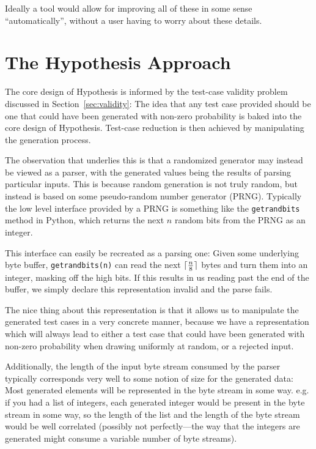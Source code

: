 
Ideally a tool would allow for improving all of these in some sense ``automatically'',
without a user having to worry about these details.

\chapter{The Hypothesis Approach}

The core design of Hypothesis is informed by the test-case validity problem discussed in Section~\ref{sec:validity}:
The idea that any test case provided should be one that could have been generated with non-zero probability is baked into the core design of Hypothesis.
Test-case reduction is then achieved by manipulating the generation process.

The observation that underlies this is that a randomized generator may instead be viewed as a parser,
with the generated values being the results of parsing particular inputs.
This is because random generation is not truly random,
but instead is based on some pseudo-random number generator (PRNG).
Typically the low level interface provided by a PRNG is something like the \texttt{getrandbits} method in Python,
which returns the next \(n\) random bits from the PRNG as an integer.

This interface can easily be recreated as a parsing one:
Given some underlying byte buffer,
\texttt{getrandbits(n)} can read the next \(\lceil\frac{n}{8}\rceil\) bytes and turn them into an integer,
masking off the high bits.
If this results in us reading past the end of the buffer,
we simply declare this representation invalid and the parse fails.

The nice thing about this representation is that it allows us to manipulate the generated test cases in a very concrete manner,
because we have a representation which will always lead to either a test case that could have been generated with non-zero probability when drawing uniformly at random,
or a rejected input.

Additionally,
the length of the input byte stream consumed by the parser typically corresponds very well to some notion of size for the generated data:
Most generated elements will be represented in the byte stream in some way.
e.g. if you had a list of integers,
each generated integer would be present in the byte stream in some way,
so the length of the list and the length of the byte stream would be well correlated
(possibly not perfectly---the way that the integers are generated might consume a variable number of byte streams).

